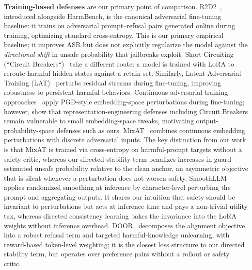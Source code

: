 \documentclass{article}
\begin{document}
\textbf{Training-based defenses} are our primary point of comparison. R2D2~\cite{mazeika2024harmbench}, introduced alongside HarmBench, is the canonical adversarial fine-tuning baseline: it trains on adversarial prompt--refusal pairs generated online during training, optimizing standard cross-entropy. This is our primary empirical baseline; it improves ASR but does not explicitly regularize the model against the \emph{directional shift} in unsafe probability that jailbreaks exploit. Short Circuiting (``Circuit Breakers``)~\cite{zou2024circuitbreakers} take a different route: a model is trained with LoRA to reroute harmful hidden states against a retain set. Similarly, Latent Adversarial Training (LAT)~\cite{sheshadri2024lat} perturbs residual streams  during fine-tuning, improving robustness to persistent harmful behaviors. Continuous adversarial training approaches~\cite{xhonneux2024afficientAT} apply PGD-style embedding-space perturbations during fine-tuning; however, \citet{schwinn2024revisiting} show that representation-engineering defenses including Circuit Breakers remain vulnerable to small embedding-space tweaks, motivating output-probability-space defenses such as ours. MixAT~\cite{dekany2025mixat} combines continuous embedding perturbations with discrete adversarial inputs.  The key distinction from our work is that MixAT is trained via cross-entropy on harmful-prompt targets without a safety critic, whereas our directed stability term penalizes increases in guard-estimated unsafe probability relative to the clean anchor, an asymmetric objective that is silent whenever a perturbation does not worsen safety.
SmoothLLM~\cite{robey2023smoothllm} applies randomized smoothing at inference by character-level perturbing the prompt and aggregating outputs. It shares our intuition that safety should be invariant to perturbations but acts at inference time and pays a non-trivial utility tax, whereas directed consistency learning bakes the invariance into the LoRA weights without inference overhead. 
DOOR~\cite{zhao2025door} decomposes the alignment  objective into a robust refusal term and targeted harmful-knowledge unlearning, with  reward-based token-level weighting; it is the closest loss structure to our directed stability term, but operates over preference pairs without a rollout or safety critic.
%
\end{document}
